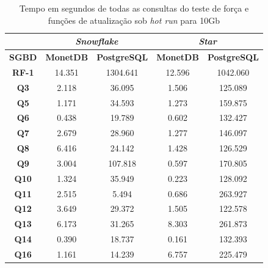 \begin{table}[t]
        \centering
        \caption{Tempo em segundos de todas as consultas do teste de força e funções de atualização sob \textit{hot run} para 10Gb}
        \label{tab:queries_hot_10}
        \begin{tabular}{|c|c|c|c|c|}
        \hline
                & \multicolumn{2}{c|}{\textit{\textbf{Snowflake}}} & \multicolumn{2}{c|}{\textit{\textbf{Star}}} \\ \hline
        \textbf{SGBD}  & \textbf{MonetDB}      & \textbf{PostgreSQL}      & \textbf{MonetDB}    & \textbf{PostgreSQL}   \\ \hline
        \textbf{RF-1}  & 14.351            & 1304.641            & 12.596           & 1042.060            \\ \hline
        \textbf{Q3}    & 2.118             & 36.095              & 1.506            & 125.089             \\ \hline
        \textbf{Q5}    & 1.171             & 34.593              & 1.273            & 159.875             \\ \hline
        \textbf{Q6}    & 0.438             & 19.789              & 0.602            & 132.427             \\ \hline
        \textbf{Q7}    & 2.679             & 28.960              & 1.277            & 146.097             \\ \hline
        \textbf{Q8}    & 6.416             & 24.142              & 1.428            & 126.529             \\ \hline
        \textbf{Q9}    & 3.004             & 107.818             & 0.597            & 170.805             \\ \hline
        \textbf{Q10}   & 1.324             & 35.949              & 0.223            & 128.092             \\ \hline
        \textbf{Q11}   & 2.515             & 5.494               & 0.686            & 263.927             \\ \hline
        \textbf{Q12}   & 3.649             & 29.372              & 1.505            & 122.578             \\ \hline
        \textbf{Q13}   & 6.173             & 31.265              & 8.303            & 261.873             \\ \hline
        \textbf{Q14}   & 0.390             & 18.737              & 0.161            & 132.393             \\ \hline
        \textbf{Q16}   & 1.161             & 14.239              & 6.757            & 225.479             \\ \hline

\end{tabular}
\end{table}
